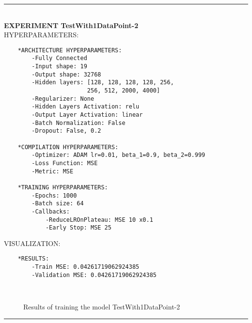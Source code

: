 \rule{0.5\textwidth}{0.5pt}\\

	{\large \textbf{EXPERIMENT TestWith1DataPoint-2}}\\
	
	{\normalsize HYPERPARAMETERS:}
	\begin{lstlisting}
	*ARCHITECTURE HYPERPARAMETERS:
		-Fully Connected
		-Input shape: 19
		-Output shape: 32768
		-Hidden layers: [128, 128, 128, 128, 256,
						256, 512, 2000, 4000]
		-Regularizer: None
		-Hidden Layers Activation: relu
		-Output Layer Activation: linear
		-Batch Normalization: False
		-Dropout: False, 0.2
	
	*COMPILATION HYPERPARAMETERS:
		-Optimizer: ADAM lr=0.01, beta_1=0.9, beta_2=0.999
		-Loss Function: MSE
		-Metric: MSE
	
	*TRAINING HYPERPARAMETERS:
		-Epochs: 1000
		-Batch size: 64
		-Callbacks: 
			-ReduceLROnPlateau: MSE 10 x0.1
			-Early Stop: MSE 25
	\end{lstlisting}
	
	{\normalsize VISUALIZATION:}
	\begin{lstlisting}
	*RESULTS:
        -Train MSE: 0.04261719062924385
        -Validation MSE: 0.04261719062924385
	\end{lstlisting}
	
	\begin{figure*}[ht!]
		\hspace{\fill}
		\hspace{\fill}	
		\\
		\caption{Results of training the model TestWith1DataPoint-2}
	\end{figure*}
	
\FloatBarrier	
\rule{0.5\textwidth}{0.5pt}\\